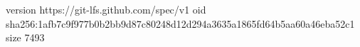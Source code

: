 version https://git-lfs.github.com/spec/v1
oid sha256:1afb7c9f977b0b2bb9d87c80248d12d294a3635a1865fd64b5aa60a46eba52c1
size 7493
